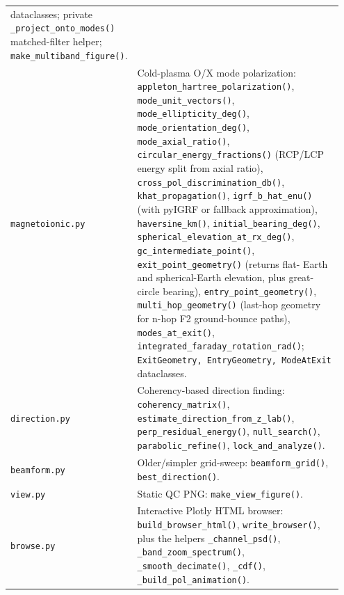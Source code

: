 \documentclass[11pt]{article}
\begin{document}
\begin{tabular}{p{0.21\linewidth}p{0.74\linewidth}}
                    dataclasses; private \texttt{\_project\_onto\_modes()}
                    matched-filter helper; \texttt{make\_multiband\_figure()}. \\
\texttt{magnetoionic.py} & Cold-plasma O/X mode polarization:
                    \texttt{appleton\_hartree\_polarization()},
                    \texttt{mode\_unit\_vectors()},
                    \texttt{mode\_ellipticity\_deg()},
                    \texttt{mode\_orientation\_deg()},
                    \texttt{mode\_axial\_ratio()},
                    \texttt{circular\_energy\_fractions()} (RCP/LCP
                    energy split from axial ratio),
                    \texttt{cross\_pol\_discrimination\_db()},
                    \texttt{khat\_propagation()},
                    \texttt{igrf\_b\_hat\_enu()} (with pyIGRF or
                    fallback approximation),
                    \texttt{haversine\_km()},
                    \texttt{initial\_bearing\_deg()},
                    \texttt{spherical\_elevation\_at\_rx\_deg()},
                    \texttt{gc\_intermediate\_point()},
                    \texttt{exit\_point\_geometry()} (returns flat-
                    Earth and spherical-Earth elevation, plus
                    great-circle bearing),
                    \texttt{entry\_point\_geometry()},
                    \texttt{multi\_hop\_geometry()} (last-hop
                    geometry for n-hop F2 ground-bounce paths),
                    \texttt{modes\_at\_exit()},
                    \texttt{integrated\_faraday\_rotation\_rad()};
                    \texttt{ExitGeometry, EntryGeometry, ModeAtExit}
                    dataclasses. \\
\texttt{direction.py} & Coherency-based direction finding:
                    \texttt{coherency\_matrix()},
                    \texttt{estimate\_direction\_from\_z\_lab()},
                    \texttt{perp\_residual\_energy()},
                    \texttt{null\_search()},
                    \texttt{parabolic\_refine()},
                    \texttt{lock\_and\_analyze()}. \\
\texttt{beamform.py}  & Older/simpler grid-sweep:
                    \texttt{beamform\_grid()},
                    \texttt{best\_direction()}. \\
\texttt{view.py}      & Static QC PNG: \texttt{make\_view\_figure()}. \\
\texttt{browse.py}    & Interactive Plotly HTML browser:
                    \texttt{build\_browser\_html()},
                    \texttt{write\_browser()}, plus the helpers
                    \texttt{\_channel\_psd()},
                    \texttt{\_band\_zoom\_spectrum()},
                    \texttt{\_smooth\_decimate()},
                    \texttt{\_cdf()},
                    \texttt{\_build\_pol\_animation()}. \\
\bottomrule
\end{tabular}
\end{document}
